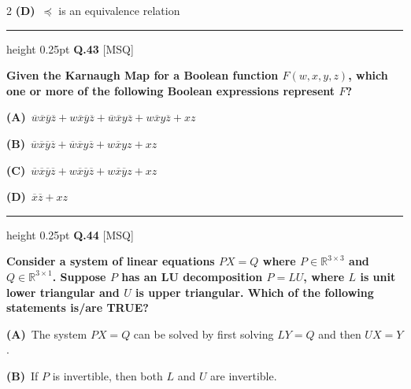 \documentclass[a4paper,10pt,twoside]{article}
\begin{document}
\begin{multicols}{2}
\textbf{(D)}~$\preceq$ is an equivalence relation
\par\vspace{6pt}\hrule height 0.25pt\vspace{6pt}
\noindent\textbf{Q.43} \hfill {\footnotesize\textsf{[MSQ]}}
\par\vspace{2pt}
{\bfseries Given the Karnaugh Map for a Boolean function $F(w, x, y, z)$, which one or more of the following Boolean expressions represent $F$? \par}
\par\vspace{2pt}\noindent
\textbf{(A)}~$\overline{w}\overline{x}\overline{y}\overline{z} + w\overline{x}\overline{y}\overline{z} + \overline{w}\overline{x}y\overline{z} + w\overline{x}y\overline{z} + xz$\par\vspace{2pt}\noindent
\textbf{(B)}~$\overline{w}\overline{x}\overline{y}\overline{z} + \overline{w}\overline{x}y\overline{z} + w\overline{x}yz + xz$\par\vspace{2pt}\noindent
\textbf{(C)}~$\overline{w}\overline{x}\overline{y}\overline{z} + w\overline{x}\overline{y}\overline{z} + w\overline{x}\overline{y}z + xz$\par\vspace{2pt}\noindent
\textbf{(D)}~$\overline{x}\overline{z} + xz$
\par\vspace{6pt}\hrule height 0.25pt\vspace{6pt}
\noindent\textbf{Q.44} \hfill {\footnotesize\textsf{[MSQ]}}
\par\vspace{2pt}
{\bfseries Consider a system of linear equations $PX = Q$ where $P \in \mathbb{R}^{3 \times 3}$ and $Q \in \mathbb{R}^{3 \times 1}$. Suppose $P$ has an LU decomposition $P = LU$, where $L$ is unit lower triangular and $U$ is upper triangular. Which of the following statements is/are TRUE? \par}
\par\vspace{2pt}\noindent
\textbf{(A)}~The system $PX = Q$ can be solved by first solving $LY = Q$ and then $UX = Y$.\par\vspace{2pt}\noindent
\textbf{(B)}~If $P$ is invertible, then both $L$ and $U$ are invertible.\par\vspace{2pt}\noindent

\end{multicols}
\end{document}
